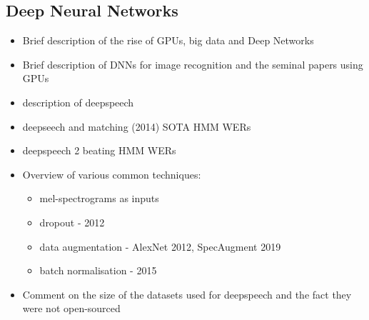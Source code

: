 \subsection{Deep Neural Networks}
\begin{itemize}   
    \item Brief description of the rise of GPUs, big data and Deep Networks
    \item Brief description of DNNs for image recognition and the seminal papers using GPUs
    \item description of deepspeech \cite{citationrequired}
    \item deepseech and matching (2014) SOTA HMM WERs \cite{citationrequired}
    \item deepspeech 2 beating HMM WERs \cite{amodei16_deepeech2}
    \item Overview of various common techniques:
    \begin{itemize}
        \item mel-spectrograms as inputs
        \item dropout - 2012
        \item data augmentation - AlexNet 2012, SpecAugment 2019
        \item batch normalisation - 2015
    \end{itemize}
    \item Comment on the size of the datasets used for deepspeech and the fact they were not open-sourced
\end{itemize}


